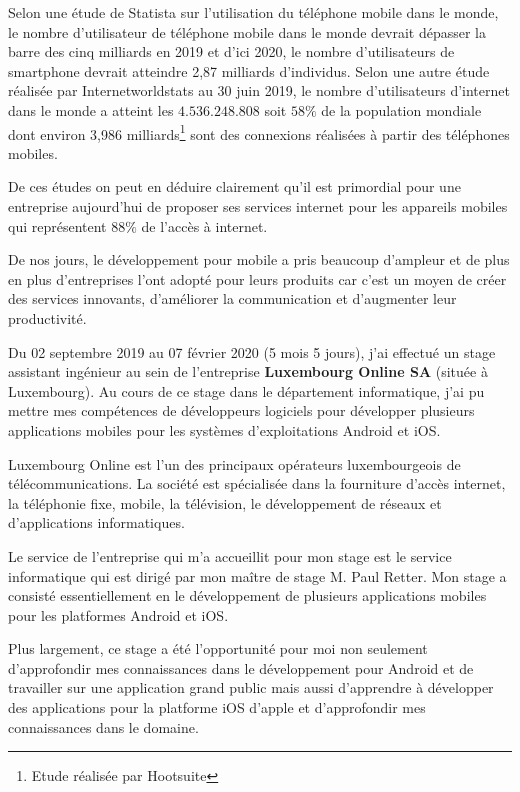 	Selon une étude de Statista sur l'utilisation du téléphone mobile dans le monde, le nombre d'utilisateur de téléphone mobile dans le monde devrait dépasser la barre des cinq milliards en 2019 et d'ici 2020, le nombre d'utilisateurs de smartphone devrait atteindre 2,87 milliards d'individus. Selon une autre étude réalisée par \og Internetworldstats \fg{,}  au 30 juin 2019, le nombre d'utilisateurs d'internet dans le monde a atteint les $4.536.248.808$ soit $58 \% $ de la population mondiale dont environ 3,986 milliards\footnote{Etude réalisée par Hootsuite} sont des connexions réalisées à partir des téléphones mobiles.
	
	De ces études on peut en déduire clairement qu'il est primordial pour une entreprise aujourd'hui de proposer ses services internet pour les appareils mobiles  qui  représentent $88\% $ de l'accès à internet. 
	
	De nos jours, le développement pour mobile a pris beaucoup d'ampleur  et de plus en plus d'entreprises l'ont adopté pour leurs produits car c'est un moyen de créer des services innovants, d'améliorer la communication et d'augmenter leur productivité.
	
	Du 02 septembre 2019 au 07 février 2020 (5 mois 5 jours), j'ai effectué un stage assistant ingénieur au sein de l'entreprise \textbf{Luxembourg Online SA} (située à Luxembourg). Au cours de ce stage dans le département informatique, j'ai pu mettre mes compétences de développeurs logiciels pour développer plusieurs applications mobiles pour les systèmes d'exploitations \gls{Android} et \gls{iOS}.
	
	Luxembourg Online est l'un des principaux opérateurs luxembourgeois de télécommunications. La société est spécialisée dans la fourniture d'accès internet, la téléphonie fixe, mobile, la télévision, le développement de réseaux et d'applications informatiques.
	
	Le service de l'entreprise qui m'a accueillit pour mon stage est le service informatique qui est dirigé par mon maître de stage M. Paul Retter. Mon stage a consisté essentiellement en le développement de plusieurs applications mobiles pour les platformes Android\cite{android} et iOS.
	
	Plus largement, ce stage a été l'opportunité pour moi non seulement d'approfondir mes connaissances dans le développement pour Android et de travailler sur une application grand public mais aussi d'apprendre à développer des applications pour la platforme iOS d'apple et d'approfondir mes connaissances dans le domaine.
	

